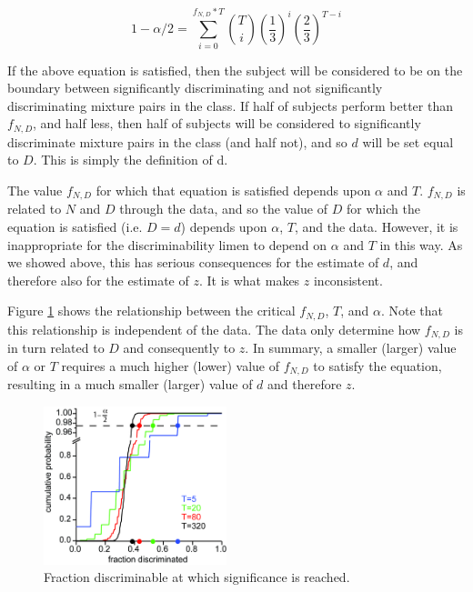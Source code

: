 \documentclass[letterpaper,twocolumn,10pt]{article}
\begin{document}
\begin{equation}
\label{eq:analytical2}
1 - \alpha/2 = \sum_{i=0}^{f_{N,D}*T} \binom{T}{i}(\frac{1}{3})^{i}(\frac{2}{3})^{T-i}
\end{equation}

If the above equation is satisfied, then the subject will be considered to be on the boundary 
between significantly discriminating and not significantly discriminating mixture pairs in the class.  
If half of subjects perform better than $f_{N,D}$, and half less, 
then half of subjects will be considered to significantly discriminate mixture pairs in the class (and half not), 
and so $d$ will be set equal to $D$.  
This is simply the definition of d.

The value $f_{N,D}$ for which that equation is satisfied depends upon $\alpha$ and $T$.  
$f_{N,D}$ is related to $N$ and $D$ through the data, 
and so the value of $D$ for which the equation is satisfied (i.e. $D=d$)
depends upon $\alpha$, $T$, and the data.  
However, it is inappropriate for the discriminability limen to depend on $\alpha$ and $T$ in this way.  
As we showed above, this has serious consequences for the estimate of $d$, and therefore also for the estimate of $z$.  
It is what makes $z$ inconsistent.  

Figure \ref{fig:alpha_crossing} shows the relationship between the critical $f_{N,D}$, $T$, and $\alpha$.  
Note that this relationship is independent of the data.  
The data only determine how $f_{N,D}$ is in turn related to $D$ and consequently to $z$.  
In summary, a smaller (larger) value of $\alpha$ or $T$ requires a much higher (lower) value of $f_{N,D}$ to satisfy the equation, 
resulting in a much smaller (larger) value of $d$ and therefore $z$.  

\begin{figure}
    \centering
    \includegraphics[width=0.475\textwidth]{figures/Fig9_alpha_Crossing}
    \caption{
Fraction discriminable at which significance is reached.}
    \label{fig:alpha_crossing}
\end{figure} 
\end{document}
